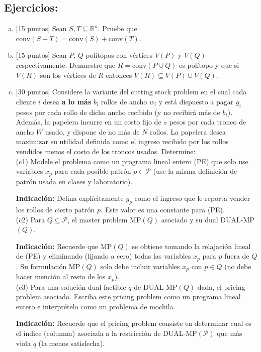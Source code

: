 \documentclass{article}
\newcommand{\RR}{\mathbb R}
\theoremstyle{plain}
\theoremstyle{definition}
\theoremstyle{Azul}
\begin{document}
\subsection*{Ejercicios:}
\begin{enumerate}[(a)]
\item {} [15 puntos] Sean $S,T\subseteq \RR^n$. Pruebe que $\text{conv}(S + T)=\text{conv}(S)+\text{conv}(T)$.
\item {} [15 puntos] Sean $P$, $Q$ polítopos con vértices $V(P)$ y $V(Q)$ respectivamente. Demuestre que
$R=\text{conv}(P\cup Q)$ es polítopo y que si $V(R)$ son los vértices de $R$ entonces $V(R)\subseteq V(P)\cup V(Q)$.
\item {} [30 puntos] Considere la variante del cutting stock problem en el cual cada cliente $i$ desea \textbf{a lo más} $b_i$ rollos de ancho $w_i$ y está dispuesto a pagar $g_i$ pesos por cada rollo de dicho ancho recibido (y no recibirá más de $b_i$). Además, la papelera incurre en un costo fijo de $s$ pesos por cada tronco de ancho $W$ usado, y dispone de no más de $N$ rollos. La papelera desea maximizar su utilidad definida como el ingreso recibido por los rollos vendidos menos el costo de los troncos usados. Determine:\\[2pt]


(c1) Modele el problema como un programa lineal entero (PE) que solo use variables $x_p$ para cada posible patrón $p\in \mathcal{P}$ (use la misma definición de patrón usada en clases y laboratorio).

\textbf{Indicación:} Defina explícitamente $g_p$ como el ingreso que le reporta vender los rollos de cierto patrón $p$. Este valor es una constante para (PE).\\[2pt]

(c2) Para $Q\subseteq \mathcal{P}$, el master problem MP$(Q)$ asociado y su dual DUAL-MP$(Q)$.

\textbf{Indicación:} Recuerde que MP$(Q)$ se obtiene tomando la relajación lineal de (PE) y eliminando (fijando a cero) todas las variables $x_p$ para $p$ fuera de $Q$. Su formulación MP$(Q)$ solo debe incluir variables $x_p$ con $p\in Q$ (no debe hacer mención al resto de los $x_p$).\\[2pt]

(c3) Para una solución dual factible $q$ de DUAL-MP$(Q)$ dada, el pricing problem asociado. Escriba este pricing problem como un programa lineal entero e interprételo como un problema de mochila.

\textbf{Indicación:} Recuerde que el pricing problem consiste en determinar cual es el índice (columna) asociada a la restricción de DUAL-MP$(\mathcal{P})$ que más viola $q$ (la menos satisfecha).
\end{enumerate}




	
\end{document}
